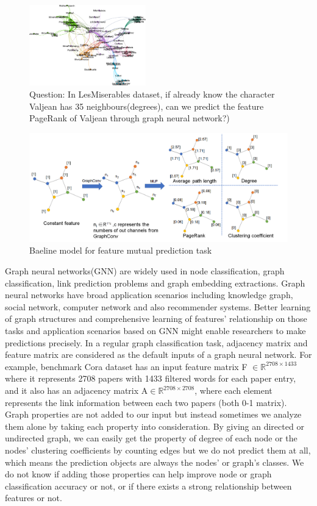 \documentclass[sigconf]{acmart}
\begin{document}
\begin{figure}[!h]
    \centering
    \includegraphics[width = 0.45\textwidth]{fig/LesMiserables.eps}
    \caption{Question: In LesMiserables dataset, if already know the character Valjean has 35 neighbours(degrees), can we predict the feature PageRank of Valjean through graph neural network?) }
\end{figure}

\begin{figure}
    \centering
    \includegraphics[width=1\textwidth]{Pipeline.jpg}
    \caption{Baeline model for feature mutual prediction task}
\end{figure}


 Graph neural networks(GNN) are widely used in node classification, graph classification, link prediction problems and graph embedding extractions. Graph neural networks have broad application scenarios including knowledge graph, social network, computer network and also recommender systems. Better learning of graph structures and comprehensive learning of features' relationship on those tasks and application scenarios based on GNN might enable researchers to make predictions precisely. In a regular graph classification task, adjacency matrix and feature matrix are considered as the default inputs of a graph neural network. For example, benchmark Cora dataset has an input feature matrix F  $\in \mathbb{R}^{2708 \times1433}$ where it represents 2708 papers with 1433 filtered words for each paper entry, and it also has an adjacency matrix A$ \in \mathbb{R}^{2708 \times2708}$, 
where each element represents the link information between each two papers (both 0-1 matrix). Graph properties are not added to our input but instead sometimes we analyze them alone by taking each property into consideration. By giving an directed or undirected graph, we can easily get the property of degree of each node or the nodes' clustering coefficients by counting edges but we do not predict them at all, which means the prediction objects are always the nodes' or graph's classes. We do not know if adding those properties can help improve node or graph classification accuracy or not, or if there exists a strong relationship between features or not. 
\end{document}
